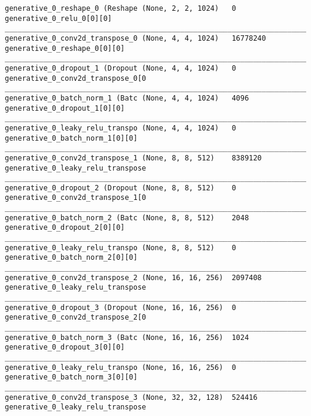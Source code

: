 \begin{lstlisting}[caption={dSprites-VLAE Decoder},captionpos=b,basicstyle=\tiny, label={lst:dsprites-vlae-decoder}]
generative_0_reshape_0 (Reshape (None, 2, 2, 1024)   0           generative_0_relu_0[0][0]
__________________________________________________________________________________________________
generative_0_conv2d_transpose_0 (None, 4, 4, 1024)   16778240    generative_0_reshape_0[0][0]
__________________________________________________________________________________________________
generative_0_dropout_1 (Dropout (None, 4, 4, 1024)   0           generative_0_conv2d_transpose_0[0
__________________________________________________________________________________________________
generative_0_batch_norm_1 (Batc (None, 4, 4, 1024)   4096        generative_0_dropout_1[0][0]
__________________________________________________________________________________________________
generative_0_leaky_relu_transpo (None, 4, 4, 1024)   0           generative_0_batch_norm_1[0][0]
__________________________________________________________________________________________________
generative_0_conv2d_transpose_1 (None, 8, 8, 512)    8389120     generative_0_leaky_relu_transpose
__________________________________________________________________________________________________
generative_0_dropout_2 (Dropout (None, 8, 8, 512)    0           generative_0_conv2d_transpose_1[0
__________________________________________________________________________________________________
generative_0_batch_norm_2 (Batc (None, 8, 8, 512)    2048        generative_0_dropout_2[0][0]
__________________________________________________________________________________________________
generative_0_leaky_relu_transpo (None, 8, 8, 512)    0           generative_0_batch_norm_2[0][0]
__________________________________________________________________________________________________
generative_0_conv2d_transpose_2 (None, 16, 16, 256)  2097408     generative_0_leaky_relu_transpose
__________________________________________________________________________________________________
generative_0_dropout_3 (Dropout (None, 16, 16, 256)  0           generative_0_conv2d_transpose_2[0
__________________________________________________________________________________________________
generative_0_batch_norm_3 (Batc (None, 16, 16, 256)  1024        generative_0_dropout_3[0][0]
__________________________________________________________________________________________________
generative_0_leaky_relu_transpo (None, 16, 16, 256)  0           generative_0_batch_norm_3[0][0]
__________________________________________________________________________________________________
generative_0_conv2d_transpose_3 (None, 32, 32, 128)  524416      generative_0_leaky_relu_transpose

\end{lstlisting}
